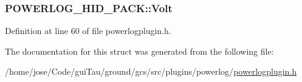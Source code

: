 \hypertarget{struct_p_o_w_e_r_l_o_g___h_i_d___p_a_c_k_ad9cd709bfba747e457f92eb02eb01146}{
\subsubsection[{Volt}]{ P\-O\-W\-E\-R\-L\-O\-G\-\_\-\-H\-I\-D\-\_\-\-P\-A\-C\-K\-::\-Volt}}\label{struct_p_o_w_e_r_l_o_g___h_i_d___p_a_c_k_ad9cd709bfba747e457f92eb02eb01146}


Definition at line 60 of file powerlogplugin.\-h.



The documentation for this struct was generated from the following file\-:\begin{DoxyCompactItemize}
\item 
/home/jose/\-Code/gui\-Tau/ground/gcs/src/plugins/powerlog/\hyperlink{powerlogplugin_8h}{powerlogplugin.\-h}\end{DoxyCompactItemize}
